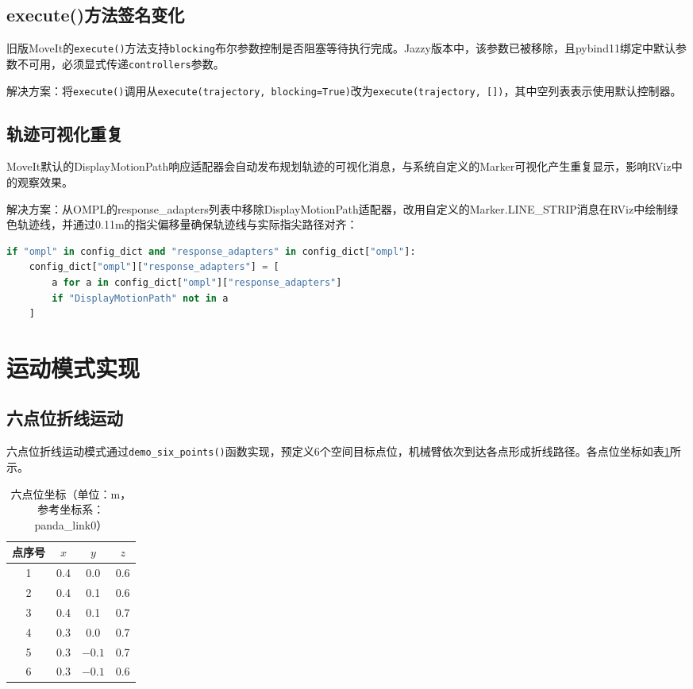 \documentclass[a4paper,12pt]{ctexart}
\newcommand{\bodytext}{\fontsize{12pt}{20pt}\selectfont\setlength{\parskip}{0pt}}
\begin{document}
\subsection{execute()方法签名变化}

\bodytext

旧版MoveIt的\texttt{execute()}方法支持\texttt{blocking}布尔参数控制是否阻塞等待执行完成。Jazzy版本中，该参数已被移除，且pybind11绑定中默认参数不可用，必须显式传递\texttt{controllers}参数。

解决方案：将\texttt{execute()}调用从\texttt{execute(trajectory, blocking=True)}改为\texttt{execute(trajectory, [])}，其中空列表表示使用默认控制器。

\subsection{轨迹可视化重复}

\bodytext

MoveIt默认的DisplayMotionPath响应适配器会自动发布规划轨迹的可视化消息，与系统自定义的Marker可视化产生重复显示，影响RViz中的观察效果。

解决方案：从OMPL的response\_adapters列表中移除DisplayMotionPath适配器，改用自定义的Marker.LINE\_STRIP消息在RViz中绘制绿色轨迹线，并通过0.11m的指尖偏移量确保轨迹线与实际指尖路径对齐：

\begin{lstlisting}[language=Python, caption={移除默认轨迹显示适配器}]
if "ompl" in config_dict and "response_adapters" in config_dict["ompl"]:
    config_dict["ompl"]["response_adapters"] = [
        a for a in config_dict["ompl"]["response_adapters"]
        if "DisplayMotionPath" not in a
    ]
\end{lstlisting}

\section{运动模式实现}

\subsection{六点位折线运动}

\bodytext

六点位折线运动模式通过\texttt{demo\_six\_points()}函数实现，预定义6个空间目标点位，机械臂依次到达各点形成折线路径。各点位坐标如表\ref{tab:sixpts}所示。

\begin{table}[htbp]
\centering
\caption{六点位坐标（单位：m，参考坐标系：panda\_link0）}
\label{tab:sixpts}
\begin{tabular}{cccc}
\toprule
点序号 & $x$ & $y$ & $z$ \\
\midrule
1 & 0.4 & 0.0 & 0.6 \\
2 & 0.4 & 0.1 & 0.6 \\
3 & 0.4 & 0.1 & 0.7 \\
4 & 0.3 & 0.0 & 0.7 \\
5 & 0.3 & $-0.1$ & 0.7 \\
6 & 0.3 & $-0.1$ & 0.6 \\
\bottomrule
\end{tabular}
\end{table}
\end{document}
